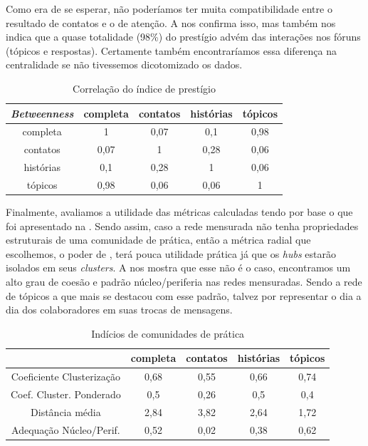 Como era de se esperar, não poderíamos ter muita compatibilidade entre o
resultado de contatos e o de atenção. A  nos confirma
isso, mas também nos indica que a quase totalidade (98\%) do prestígio advém
das interações nos fóruns (tópicos e respostas). Certamente também
encontraríamos essa diferença na centralidade se não tivessemos dicotomizado os
dados.

\begin{table}[htbp]
	\setlength{\arrayrulewidth}{2\arrayrulewidth}  %
	\setlength{\belowcaptionskip}{10pt}  %
	\caption{Correlação do índice de prestígio} \centering   
	\begin{tabular}{| c | c c c c|}
	\hline
	\emph{Betweenness} & completa & contatos & histórias & tópicos \\ \hline
	completa & 1 & 0,07 & 0,1 & 0,98 \\
	contatos & 0,07 & 1 & 0,28 & 0,06 \\
	histórias & 0,1 & 0,28 & 1 & 0,06 \\
	tópicos & 0,98 & 0,06 & 0,06 & 1 \\\hline
	\end{tabular}
	\label{ap:tab:prest-corr}
\end{table}

Finalmente, avaliamos a utilidade das métricas calculadas tendo por base o que
foi apresentado na . Sendo assim, caso a rede mensurada
não tenha propriedades estruturais de uma comunidade de prática, então a métrica
radial que escolhemos, o poder de \citeauthor{Bonacich1987}, terá pouca
utilidade prática já que os \emph{hubs} estarão isolados em seus
\emph{clusters}. A  nos mostra que esse não é o caso,
encontramos um alto grau de coesão e padrão núcleo/periferia nas redes
mensuradas. Sendo a rede de tópicos a que mais se destacou com esse padrão,
talvez por representar o dia a dia dos colaboradores em suas trocas de
mensagens.

\begin{table}[htbp]
	\setlength{\arrayrulewidth}{2\arrayrulewidth}  %
	\setlength{\belowcaptionskip}{10pt}  %
	\caption{Indícios de comunidades de prática} \centering   
	\begin{tabular}{| c | c | c | c | c |}
	\hline
	 & completa & contatos & histórias & tópicos \\ \hline
	Coeficiente Clusterização & 0,68 & 0,55 & 0,66 & 0,74 \\
	Coef. Cluster. Ponderado & 0,5 & 0,26 & 0,5 & 0,4 \\
	Distância média & 2,84 & 3,82 & 2,64 & 1,72 \\
	Adequação Núcleo/Perif. & 0,52 & 0,02 & 0,38 & 0,62 \\\hline
	\end{tabular}
	\label{ap:tab:comu_prat}
\end{table}

